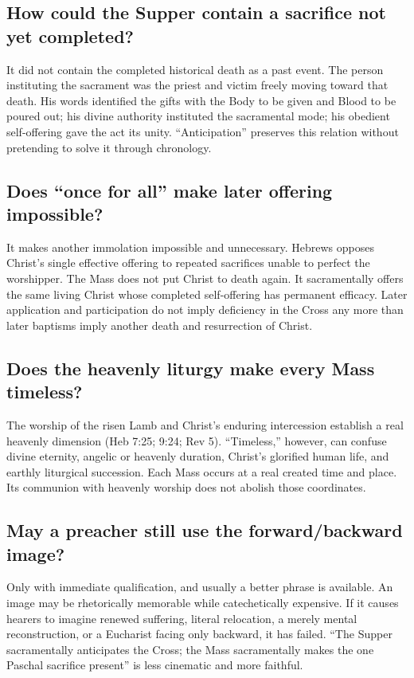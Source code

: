 \begin{deepstudy}
\subsection*{How could the Supper contain a sacrifice not yet completed?}

It did not contain the completed historical death as a past event. The person
instituting the sacrament was the priest and victim freely moving toward that
death. His words identified the gifts with the Body to be given and Blood to
be poured out; his divine authority instituted the sacramental mode; his
obedient self-offering gave the act its unity. ``Anticipation'' preserves this
relation without pretending to solve it through chronology.

\subsection*{Does ``once for all'' make later offering impossible?}

It makes another immolation impossible and unnecessary. Hebrews opposes
Christ's single effective offering to repeated sacrifices unable to perfect
the worshipper. The Mass does not put Christ to death again. It sacramentally
offers the same living Christ whose completed self-offering has permanent
efficacy. Later application and participation do not imply deficiency in the
Cross any more than later baptisms imply another death and resurrection of
Christ.

\subsection*{Does the heavenly liturgy make every Mass timeless?}

The worship of the risen Lamb and Christ's enduring intercession establish a
real heavenly dimension (Heb 7:25; 9:24; Rev 5). ``Timeless,'' however, can
confuse divine eternity, angelic or heavenly duration, Christ's glorified human
life, and earthly liturgical succession. Each Mass occurs at a real created
time and place. Its communion with heavenly worship does not abolish those
coordinates.

\subsection*{May a preacher still use the forward/backward image?}

Only with immediate qualification, and usually a better phrase is available.
An image may be rhetorically memorable while catechetically expensive. If it
causes hearers to imagine renewed suffering, literal relocation, a merely
mental reconstruction, or a Eucharist facing only backward, it has failed.
``The Supper sacramentally anticipates the Cross; the Mass sacramentally makes
the one Paschal sacrifice present'' is less cinematic and more faithful.


\end{deepstudy}
